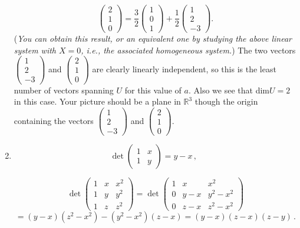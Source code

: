 \begin{enumerate}
$$
\begin{pmatrix}2\\1\\0\end{pmatrix}=\frac32\begin{pmatrix}1\\0\\1\end{pmatrix}+\frac12\begin{pmatrix}1\\2\\-3\end{pmatrix}.
$$
({\it You can obtain this result, or an equivalent one by studying the above linear system with $X=0$, i.e., the associated homogeneous system.}) The two vectors $\begin{pmatrix}1\\2\\-3\end{pmatrix}$ and $\begin{pmatrix}2\\1\\0\end{pmatrix}$ are clearly linearly independent,
so this is the least number of vectors spanning $U$ for this value of $a$. Also we see that dim$U=2$ in this case. Your picture should be
a plane in ${\mathbb R}^3$ though the origin  containing the vectors $\begin{pmatrix}1\\2\\-3\end{pmatrix}$ and $\begin{pmatrix}2\\1\\0\end{pmatrix}$.

\item 
$$
\det \begin{pmatrix}1 & x\\ 1 & y\end{pmatrix}=y-x\, ,\ \ 
$$

$$
\det \begin{pmatrix}1 & x & x^2\\ 1 & y&y^2\\ 1& z&z^2\end{pmatrix}=
\det \begin{pmatrix}1 & x & x^2\\ 0 & y-x&y^2-x^2\\ 0& z-x&z^2-x^2\end{pmatrix}$$ $$
=(y-x)(z^2-x^2)-(y^2-x^2)(z-x)=(y-x)(z-x)(z-y)\, .
$$


\end{enumerate}

